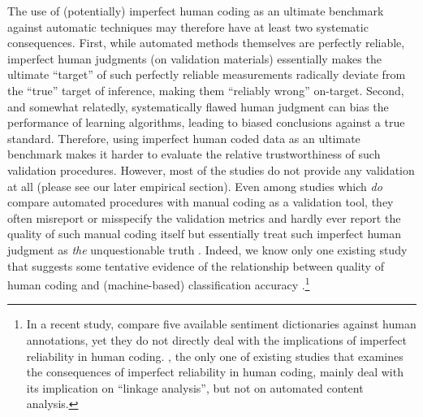 \documentclass[man, 12pt, a4paper, nolmodern, noextraspace]{apa6}
\begin{document}
    The use of (potentially) imperfect human coding as an ultimate benchmark against automatic techniques may therefore have at least two systematic consequences. First, while automated methods themselves are perfectly reliable, imperfect human judgments (on validation materials) essentially makes the ultimate \enquote{target} of such perfectly reliable measurements radically deviate from the \enquote{true} target of inference, making them \enquote{reliably wrong} on-target. Second, and somewhat relatedly, systematically flawed human judgment can bias the performance of learning algorithms, leading to biased conclusions against a true standard. Therefore, using imperfect human coded data as an ultimate benchmark makes it harder to evaluate the relative trustworthiness of such validation procedures. However, most of the studies do not provide any validation at all (please see our later empirical section). Even among studies which \textit{do} compare automated procedures with manual coding as a validation tool, they often misreport or misspecify the validation metrics and hardly ever report the quality of such manual coding itself but essentially treat such imperfect human judgment as \textit{the} unquestionable truth \parencites[e.g.,][]{gonzalez2015signals, lowe2013validating, YoungSoroka2012}. Indeed, we know only one existing study that suggests some tentative evidence of the relationship between quality of human coding and (machine-based) classification accuracy \parencite{burscher2014teaching}.\footnote{In a recent study, \textcite{gonzalez2015signals} compare five available sentiment dictionaries against human annotations, yet they do not directly deal with the implications of imperfect reliability in human coding. \textcite{scharkow2017measurement}, the only one of existing studies that examines the consequences of imperfect reliability in human coding, mainly deal with its implication on \enquote{linkage analysis}, but not on automated content analysis.}     
   
\end{document}

